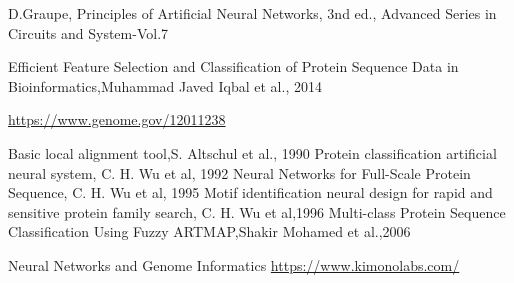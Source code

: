 \documentclass[a4paper, 10pt, conference]{ieeeconf}      %
\begin{document}
\clearpage
\newpage
\begin{thebibliography}{99}

D.Graupe, Principles of Artificial Neural Networks, 3nd ed., Advanced Series in Circuits and System-Vol.7

Efficient Feature Selection and Classification of Protein Sequence Data in Bioinformatics,Muhammad Javed Iqbal et al., 2014

\href{https://www.genome.gov/12011238}{https://www.genome.gov/12011238}

Basic local alignment tool,S. Altschul et al., 1990
Protein classification artificial neural system, C. H. Wu et al, 1992
Neural Networks for Full-Scale Protein Sequence, C. H. Wu et al, 1995
Motif identification neural design for rapid and sensitive protein family search, C. H. Wu et al,1996
Multi-class Protein Sequence Classification Using Fuzzy ARTMAP,Shakir Mohamed et al.,2006

Neural Networks and Genome Informatics
\href{https://www.kimonolabs.com/}{https://www.kimonolabs.com/}
\end{thebibliography}
\end{document}
